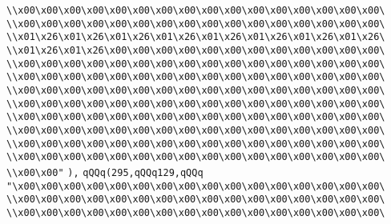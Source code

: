 \verb|\\x00\x00\x00\x00\x00\x00\x00\x00\x00\x00\x00\x00\x00\x00\x00\x00\|\newline
\verb|\\x00\x00\x00\x00\x00\x00\x00\x00\x00\x00\x00\x00\x00\x00\x00\x00\|\newline
\verb|\\x01\x26\x01\x26\x01\x26\x01\x26\x01\x26\x01\x26\x01\x26\x01\x26\|\newline
\verb|\\x01\x26\x01\x26\x00\x00\x00\x00\x00\x00\x00\x00\x00\x00\x00\x00\|\newline
\verb|\\x00\x00\x00\x00\x00\x00\x00\x00\x00\x00\x00\x00\x00\x00\x00\x00\|\newline
\verb|\\x00\x00\x00\x00\x00\x00\x00\x00\x00\x00\x00\x00\x00\x00\x00\x00\|\newline
\verb|\\x00\x00\x00\x00\x00\x00\x00\x00\x00\x00\x00\x00\x00\x00\x00\x00\|\newline
\verb|\\x00\x00\x00\x00\x00\x00\x00\x00\x00\x00\x00\x00\x00\x00\x00\x00\|\newline
\verb|\\x00\x00\x00\x00\x00\x00\x00\x00\x00\x00\x00\x00\x00\x00\x00\x00\|\newline
\verb|\\x00\x00\x00\x00\x00\x00\x00\x00\x00\x00\x00\x00\x00\x00\x00\x00\|\newline
\verb|\\x00\x00\x00\x00\x00\x00\x00\x00\x00\x00\x00\x00\x00\x00\x00\x00\|\newline
\verb|\\x00\x00\x00\x00\x00\x00\x00\x00\x00\x00\x00\x00\x00\x00\x00\x00\|\newline
\verb|\\x00\x00"|\newline
\verb|),|\newline
\verb|qQQq(295,qQQq129,qQQq|\newline
\verb|"\x00\x00\x00\x00\x00\x00\x00\x00\x00\x00\x00\x00\x00\x00\x00\x00\|\newline
\verb|\\x00\x00\x00\x00\x00\x00\x00\x00\x00\x00\x00\x00\x00\x00\x00\x00\|\newline
\verb|\\x00\x00\x00\x00\x00\x00\x00\x00\x00\x00\x00\x00\x00\x00\x00\x00\|\newline
